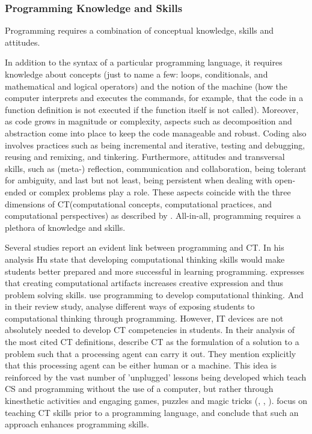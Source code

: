 \subsubsection{Programming Knowledge and Skills}\label{ProgrammingKnowledgeAndSkills}
Programming requires a combination of conceptual knowledge, skills and attitudes.

In addition to the syntax of a particular programming language, it requires knowledge about concepts (just to name a few: loops, conditionals, and mathematical and logical operators) and the notion of the machine (how the computer interprets and executes the commands, for example, that the code in a function definition is not executed if the function itself is not called). Moreover, as code grows in magnitude or complexity, aspects such as decomposition and abstraction come into place to keep the code manageable and robust. Coding also involves practices such as being incremental and iterative, testing and debugging, reusing and remixing, and tinkering. Furthermore, attitudes and transversal skills, such as (meta-) reflection, communication and collaboration, being tolerant for ambiguity, and last but not least, being persistent when dealing with open-ended or complex problems play a role. These aspects coincide with the three dimensions of CT(computational concepts, computational practices, and computational perspectives) as described by . All-in-all, programming requires a plethora of knowledge and skills.



Several studies report an evident link between programming and CT. In his analysis Hu \cite{hu2011computational} state that developing computational thinking skills would make students better prepared and more successful in learning programming.  expresses that creating computational artifacts increases creative expression and thus problem solving skills.  use programming to develop computational thinking. And in their review study,  analyse different ways of exposing students to computational thinking through programming. However, IT devices are not absolutely needed to develop CT competencies in students\cite{corradini2017conceptions}. In their analysis of the most cited CT definitions, \cite{corradini2017conceptions} describe CT as the formulation of a solution to a problem such that a processing agent can carry it out. They mention explicitly that this processing agent can be either human or a machine. This idea is reinforced by the vast number of 'unplugged' lessons being developed which teach CS and programming without the use of a computer, but rather through kinesthetic activities and engaging games, puzzles and magic tricks (\cite{curzon2009CT}, \cite{CSUnplugged}, \cite{CSFieldGuide}).  focus on teaching CT skills prior to a programming language, and conclude that such an approach enhances programming skills.


